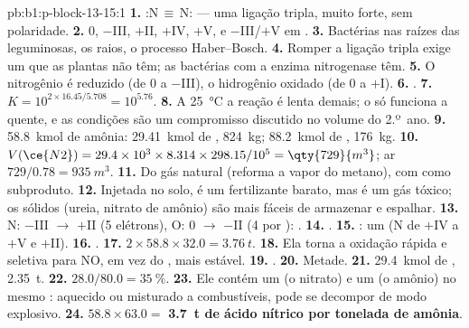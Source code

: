 \begin{solution}{pb:b1:p-block-13-15:1}
\textbf{1.} :N\,$\equiv$\,N: --- uma ligação tripla, muito forte, sem polaridade.
\textbf{2.} 0, $-$III, $+$II, $+$IV, $+$V, e $-$III/$+$V em .
\textbf{3.} Bactérias nas raízes das leguminosas, os raios, o processo
Haber--Bosch.
\textbf{4.} Romper a ligação tripla exige um  que as plantas
não têm; as bactérias com a enzima nitrogenase têm.
\textbf{5.} O nitrogênio é reduzido (de 0 a $-$III), o hidrogênio oxidado (de 0 a $+$I).
\textbf{6.} .
\textbf{7.} $K = 10^{2 \times 16.45/5.708} = 10^{5.76}$.
\textbf{8.} A \qty{25}{\celsius} a reação é lenta demais; o  só
funciona a quente, e as condições são um compromisso discutido no volume
do 2.º~ano.
\textbf{9.} \qty{58.8}{kmol} de amônia: \qty{29.41}{kmol} de ,
\qty{824}{kg}; \qty{88.2}{kmol} de , \qty{176}{kg}.
\textbf{10.} $V(\ce{N2}) = 29.4 \times 10^3 \times 8.314 \times 298.15/10^5 =
\qty{729}{m^3}$; ar $729/0.78 = \qty{935}{m^3}$.
\textbf{11.} Do gás natural (reforma a vapor do metano), com  como
subproduto.
\textbf{12.} Injetada no solo, é um fertilizante barato, mas é um gás
tóxico; os sólidos (ureia, nitrato de amônio) são mais fáceis de
armazenar e espalhar.
\textbf{13.} N: $-$III $\to$ $+$II (5 elétrons), O: 0 $\to$ $-$II (4 por
): .
\textbf{14.} .
\textbf{15.} : um  (N de
$+$IV a $+$V e $+$II).
\textbf{16.} .
\textbf{17.} $2 \times 58.8 \times 32.0 = \qty{3.76}{t}$.
\textbf{18.} Ela torna a oxidação rápida e seletiva para NO, em vez do
, mais estável.
\textbf{19.} .
\textbf{20.} Metade.
\textbf{21.} \qty{29.4}{kmol} de , \qty{2.35}{t}.
\textbf{22.} $28.0/80.0 = \qty{35}{\percent}$.
\textbf{23.} Ele contém um  (o nitrato) e um  (o amônio) no
mesmo : aquecido ou misturado a combustíveis, pode se decompor de
modo explosivo.
\textbf{24.} $58.8 \times 63.0 =$ \textbf{\qty{3.7}{t} de ácido nítrico por
tonelada de amônia}.
\end{solution}
